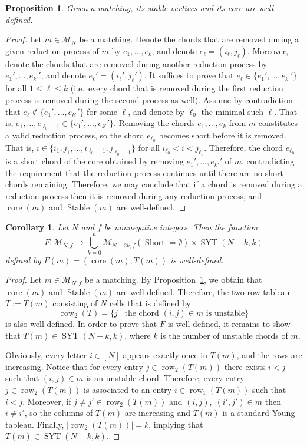 \documentclass[11pt]{article}
\newtheorem{proposition}[theo]{Proposition}
\newtheorem{corollary}[theo]{Corollary}
\theoremstyle{definition}
\providecommand{\ie}{i.e.\ }
\numberwithin{equation}{section}
\newcommand{\Syt}{\operatorname{SYT}}
\newcommand{\Short}{\operatorname{Short}}
\newcommand{\Stable}{\operatorname{Stable}}
\newcommand{\core}{\operatorname{core}}
\newcommand{\row}{\operatorname{row}}
\newcommand{\M}{\mathcal{M}}
\begin{document}
\begin{proposition}
\label{prop:core well defined}
    Given a matching, its stable vertices and its core are well-defined.
\end{proposition}
\begin{proof}
    Let $m \in \M_N$ be a matching. Denote the chords that are removed during a given reduction process of $m$ by $e_1, \dots, e_k$, and denote $e_\ell = (i_\ell,j_\ell)$. Moreover, denote the chords that are removed during another reduction process by $e_1', \dots, e_{k'}'$, and denote $e_\ell' = (i_\ell',j_\ell')$. It suffices to prove that $e_\ell \in \{e_1', \dots, e_{k'}'\}$ for all $1 \le \ell \le k$ (\ie every chord that is removed during the first reduction process is removed during the second process as well). Assume by contradiction that $e_\ell \notin \{e_1', \dots, e_{k'}'\}$ for some $\ell$, and denote by $\ell_0$ the minimal such $\ell$.
    That is, $e_1,\dots,e_{\ell_0-1} \in \{e_1', \dots, e_{k'}'\}$. Removing the chords $e_1, \dots, e_k$ from $m$ constitutes a valid reduction process, so the chord $e_{\ell_0}$ becomes short before it is removed. That is, $i \in \{i_1,j_1,\dots,i_{\ell_0-1},j_{\ell_0-1}\}$ for all $i_{\ell_0} < i < j_{\ell_0}$. Therefore, the chord $e_{\ell_0}$ is a short chord of the core obtained by removing $e_1', \dots, e_{k'}'$ of $m$, contradicting the requirement that the reduction process continues until there are no short chords remaining. Therefore, we may conclude that if a chord is removed during a reduction process then it is removed during any reduction process, and $\core(m)$ and $\Stable(m)$ are well-defined.
\end{proof}

\begin{corollary}
    Let $N$ and $f$ be nonnegative integers. Then the function
    \[
        F:\M_{N,f} \to \bigcup_{k=0}^n \M_{N-2k,f}(\Short = \emptyset) \times \Syt(N-k,k)
    \]
    defined by $F(m) = (\core(m),T(m))$ is well-defined.
\end{corollary}

\begin{proof}
    Let $m\in \M_{N,f}$ be a matching. By Proposition~\ref{prop:core well defined}, we obtain that $\core(m)$ and $\Stable(m)$ are well-defined. Therefore, the two-row tableau $T:=T(m)$ consisting of $N$ cells that is defined by
    \[
        \row_2(T) = \{j \mid \text{the chord } (i,j) \in m \text{ is unstable}\}
    \]
    is also well-defined. In order to prove that $F$ is well-defined, it remains to show that $T(m) \in \Syt(N-k,k)$, where $k$ is the number of unstable chords of $m$.

    Obviously, every letter $i \in [N]$ appears exactly once in $T(m)$, and the rows are increasing. Notice that for every entry $j \in \row_2(T(m))$ there exists $i<j$ such that $(i,j) \in m$ is an unstable chord. Therefore, every entry $j \in \row_2(T(m))$ is associated to an entry $i \in \row_1(T(m))$ such that $i<j$. Moreover, if $j\ne j' \in \row_2(T(m))$ and $(i,j),\; (i',j') \in m$ then $i \ne i'$, so the columns of $T(m)$ are increasing and $T(m)$ is a standard Young tableau. Finally, $|\row_2(T(m))| = k$, implying that $T(m) \in \Syt(N-k,k)$.
\end{proof}
\end{document}
